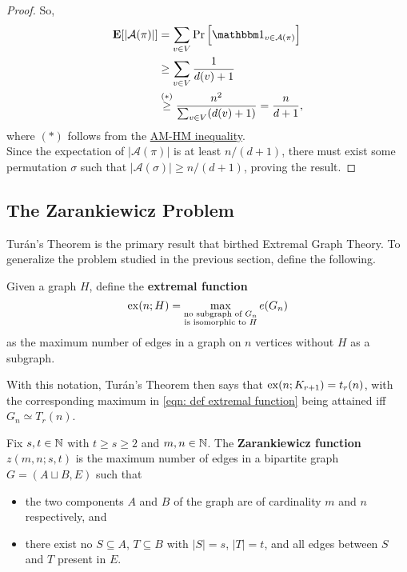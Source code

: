 \documentclass{article}
\begin{document}
\begin{proof}
			So,
			\begin{align*}
				\expec[ |\mathcal{A}(\pi)| ] &= \sum_{v \in V} \Pr\left[ \indic_{v \in \mathcal{A}(\pi)} \right] \\
				&\ge \sum_{v \in V} \frac{1}{d(v) + 1} \\
				&\stackrel{\small{(*)}}{\ge} \frac{n^2}{\sum_{v \in V} (d(v) + 1)} = \frac{n}{d+1},
			\end{align*}
			where $(*)$ follows from the \href{https://en.wikipedia.org/wiki/HM-GM-AM-QM_inequalities}{AM-HM inequality}.\\
			Since the expectation of $|\mathcal{A}(\pi)|$ is at least $n/(d+1)$, there must exist some permutation $\sigma$ such that $|\mathcal{A}(\sigma)| \ge n/(d+1)$, proving the result.
		\end{proof}

	\subsection{The Zarankiewicz Problem}

		Tur\'{a}n's Theorem is the primary result that birthed Extremal Graph Theory. To generalize the problem studied in the previous section, define the following.

		\begin{fdef}
			Given a graph $H$, define the \textbf{extremal function}
			\begin{equation}
				\label{eqn: def extremal function}
				\operatorname{ex}(n;H) = \max_{\substack{\text{no subgraph of }G_n \\\text{is isomorphic to }H}} e(G_n)
			\end{equation}
			as the maximum number of edges in a graph on $n$ vertices without $H$ as a subgraph.
		\end{fdef}

		With this notation, Tur\'{a}n's Theorem then says that $\operatorname{ex}(n;K_{r+1}) = t_r(n)$, with the corresponding maximum in \eqref{eqn: def extremal function} being attained iff $G_n \simeq T_r(n)$.

		\begin{fdef}
			Fix $s, t \in \mathbb{N}$ with $t \ge s \ge 2$ and $m,n\in\mathbb{N}$.
			The \textbf{Zarankiewicz function} $z(m,n;s,t)$ is the maximum number of edges in a bipartite graph $G = (A \sqcup B, E)$ such that
			\begin{itemize}
				\item the two components $A$ and $B$ of the graph are of cardinality $m$ and $n$ respectively\footnotemark, and
				\item there exist no $S \subseteq A$, $T \subseteq B$ with $|S|=s$, $|T|=t$, and all edges between $S$ and $T$ present in $E$.\footnotemark
			\end{itemize}
		\end{fdef}
\end{document}
